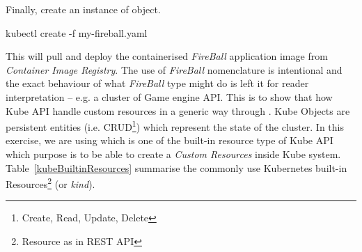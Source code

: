 \noindent Finally, create an instance of  object.
\begin{lcverbatim}
kubectl create -f my-fireball.yaml
\end{lcverbatim}

\noindent This will pull and deploy the containerised \emph{FireBall} application image from \emph{Container Image Registry}. The use of \textit{FireBall} nomenclature is intentional and the exact behaviour of what \emph{FireBall} type might do is left it for reader interpretation -- e.g. a cluster of Game engine API. This is to show that how Kube API handle custom resources in a generic way through . Kube Objects are persistent entities (i.e. CRUD\footnote{Create, Read, Update, Delete}) which represent the state of the cluster. In this exercise, we are using  which is one of the built-in resource type of Kube API which purpose is to be able to create a \textit{Custom Resources} inside Kube system. Table~\ref{kubeBuiltinResources} summarise the commonly use Kubernetes built-in Resources\footnote{Resource as in REST API} (or \emph{kind}).


